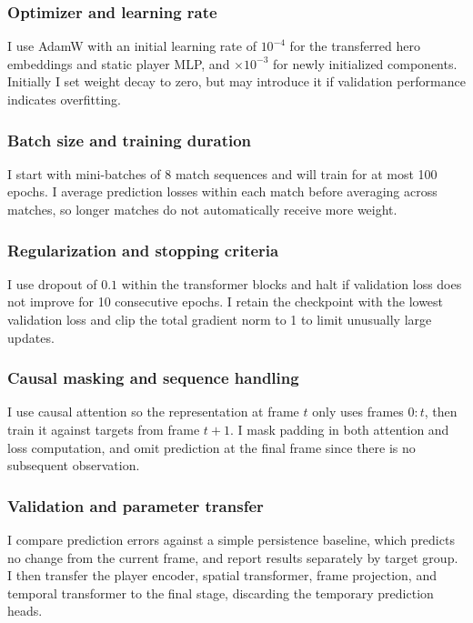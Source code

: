 \documentclass[11pt]{article}
\begin{document}
    \subsubsection{Optimizer and learning rate}
        I use AdamW with an initial learning rate of $10^{-4}$ for the transferred hero embeddings and static player MLP, and $\times10^{-3}$ for newly initialized components. Initially I set weight decay to zero, but may introduce it if validation performance indicates overfitting.

    \subsubsection{Batch size and training duration}
        I start with mini-batches of 8 match sequences and will train for at most 100 epochs. I average prediction losses within each match before averaging across matches, so longer matches do not automatically receive more weight.

    \subsubsection{Regularization and stopping criteria}
        I use dropout of $0.1$ within the transformer blocks and halt if validation loss does not improve for 10 consecutive epochs. I retain the checkpoint with the lowest validation loss and clip the total gradient norm to 1 to limit unusually large updates.

    \subsubsection{Causal masking and sequence handling}
        I use causal attention so the representation at frame $t$ only uses frames $0{:}t$, then train it against targets from frame $t+1$. I mask padding in both attention and loss computation, and omit prediction at the final frame since there is no subsequent observation.

    \subsubsection{Validation and parameter transfer}
        I compare prediction errors against a simple persistence baseline, which predicts no change from the current frame, and report results separately by target group. I then transfer the player encoder, spatial transformer, frame projection, and temporal transformer to the final stage, discarding the temporary prediction heads.
\end{document}
